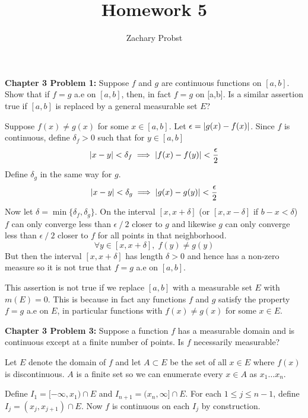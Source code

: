 \documentclass[11pt]{article}
\title{Homework 5}
\author{Zachary Probst}
\DeclarePairedDelimiter{\card}{\lvert}{\rvert}
\begin{document}
    \maketitle

    \begin{mybox}
        \textbf{Chapter 3 Problem 1:} Suppose $f$ and $g$ are continuous functions on $[a,b]$.
        Show that if $f = g$ a.e on $[a,b]$, then, in fact $f = g$ on [a,b].
        Is a similar assertion true if $[a,b]$ is replaced by a general measurable set $E$?
    \end{mybox}

    Suppose $f(x) \neq g(x)$ for some $x \in [a,b]$.
    Let $\epsilon = \card{g(x) - f(x)}$.
    Since $f$ is continuous, define $\delta_f > 0$ such that for $y \in [a,b]$
    \[
        \card{x - y} < \delta_f\implies \card{f(x) - f(y)} < \frac{\epsilon}{2}
    \]
    Define $\delta_g$ in the same way for $g$.
    \[
        \card{x - y} < \delta_g \implies \card{g(x) - g(y)} < \frac{\epsilon}{2}
    \]
    Now let $\delta = \min \{ \delta_f, \delta_g \}$.
    On the interval $[x,x+\delta]$ (or $[x,x-\delta]$ if $b - x < \delta$) $f$ can only converge less than $\epsilon \mathbin{/} 2$ closer to $g$ and likewise $g$ can only converge less than $\epsilon \mathbin{/} 2$ closer to $f$ for all points in that neighborhood.
    \[
        \forall y \in [x, x + \delta], \; f(y) \neq g(y)
    \]
    But then the interval $[x, x+ \delta]$ has length $\delta > 0$ and hence has a non-zero measure so it is not true that $f = g$ a.e on $[a,b]$.

    This assertion is not true if we replace $[a,b]$ with a measurable set $E$ with $m(E) = 0$.
    This is because in fact any functions $f$ and $g$ satisfy the property $f = g$ a.e on $E$, in particular functions with $f(x) \neq g(x)$ for some $x \in E$.

    \clearpage

    \begin{mybox}
        \textbf{Chapter 3 Problem 3:} Suppose a function $f$ has a measurable domain and is continuous except at a finite number of points.
        Is $f$ necessarily measurable?
    \end{mybox}

    Let $E$ denote the domain of $f$ and let $A \subset E$ be the set of all $x \in E$ where $f(x)$ is discontinuous.
    $A$ is a finite set so we can enumerate every $x \in A$ as $x_1 \hdots x_n$.

    Define $I_1 = [-\infty, x_1) \cap E$ and $I_{n+1} = (x_n, \infty] \cap E$.
    For each $1 \leq j \leq n-1$, define $I_j = (x_j, x_{j+1}) \cap E$.
    Now $f$ is continuous on each $I_j$ by construction.
\end{document}
